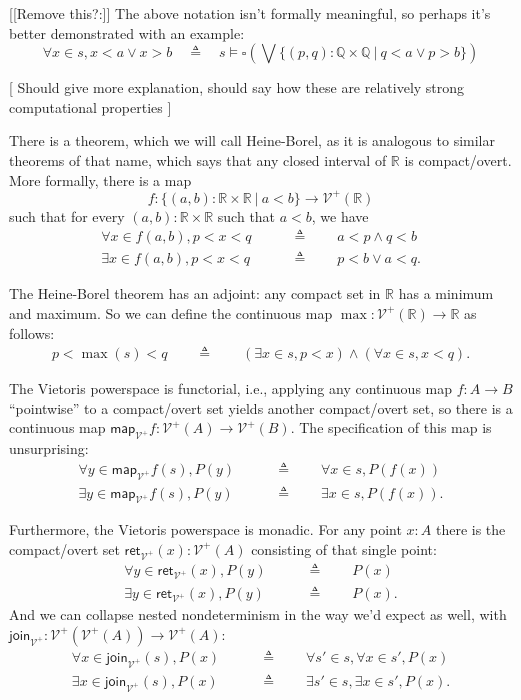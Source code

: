 \documentclass{article}           %
\newcommand{\R}{\mathbb{R}}
\newcommand{\rat}{\mathbb{Q}}
\newcommand{\suchthat}{\ |\ }
\newcommand{\Viet}{{\mathcal{V}^+}}
\newcommand{\map}[1]{\mathsf{map}_{#1}}
\newcommand{\ret}[1]{\mathsf{ret}_{#1}}
\newcommand{\join}[1]{\mathsf{join}_{#1}}
\newcommand{\defeq}{\triangleq}
\begin{document}
[[Remove this?:]] The above notation isn't formally meaningful, so perhaps it's better demonstrated with an example:
\[
\forall x \in s, x < a \vee x > b
\quad \defeq \quad 
s \models \square 
  \left(\bigvee \{ (p, q) : \rat \times \rat
     \suchthat q < a \vee p > b \} \right)
\]

[ Should give more explanation, should say how these are relatively strong computational properties ]

There is a theorem, which we will call Heine-Borel, as it is analogous to similar theorems of that name, which says that any closed interval of $\R$ is compact/overt. More formally, there is a map
\[
f : \{ (a, b) : \R \times \R \suchthat a < b \} \to \Viet(\R)
\]
such that for every $(a, b) : \R \times \R$ such that $a < b$, we have
\begin{align*}
\forall x \in f(a, b), p < x < q \qquad &\defeq \qquad a < p \wedge q < b
\\ \exists x \in f(a, b), p < x < q \qquad &\defeq \qquad p < b \vee a < q.
\end{align*}

The Heine-Borel theorem has an adjoint: any compact set in $\R$ has a minimum and maximum. So we can define the continuous map $\max : \Viet(\R) \to \R$ as follows:
\begin{align*}
p < \max(s) < q
\qquad \defeq \qquad 
\left( \exists x \in s, p < x \right) \wedge \left( \forall x \in s, x < q \right).
\end{align*}

The Vietoris powerspace is functorial, i.e., applying any continuous map $f : A \to B$ ``pointwise'' to a compact/overt set yields another compact/overt set, so there is a continuous map $\map{\Viet}{f} : \Viet(A) \to \Viet(B)$. The specification of this map is unsurprising:
\begin{align*}
\forall y \in \map{\Viet}{f}(s), P(y) \qquad &\defeq \qquad \forall x \in s, P(f(x))
\\ \exists y \in \map{\Viet}{f}(s), P(y)  \qquad &\defeq \qquad \exists x \in s, P(f(x)).
\end{align*}

Furthermore, the Vietoris powerspace is monadic. For any point $x : A$ there is the compact/overt set $\ret{\Viet}(x) : \Viet(A) $ consisting of that single point:
\begin{align*}
\forall y \in \ret{\Viet}(x), P(y) \qquad &\defeq \qquad P(x)
\\ \exists y \in \ret{\Viet}(x), P(y) \qquad &\defeq \qquad P(x).
\end{align*}
And we can collapse nested nondeterminism in the way we'd expect as well, with $\join{\Viet} : \Viet(\Viet(A)) \to \Viet(A)$:
\begin{align*}
\forall x \in \join{\Viet}(s), P(x) \qquad &\defeq \qquad \forall s' \in s, \forall x \in s', P(x)
\\ \exists x \in \join{\Viet}(s), P(x) \qquad &\defeq \qquad \exists s' \in s, \exists x \in s', P(x).
\end{align*}
\end{document}
